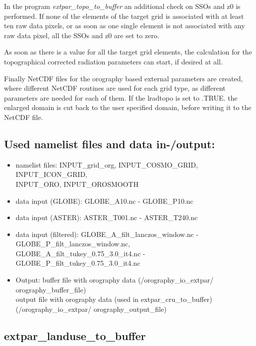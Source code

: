 \documentclass[a4paper,10pt,DIV14,BCOR1cm,titlepage,twoside]{scrartcl}
\begin{document}
In the program \textit{extpar\_topo\_to\_buffer} an additional check on SSOs and z0 is performed. If none of the elements of the target grid is associated with at least ten raw data pixels, or as soon as one single element is not associated with any raw data pixel, all the SSOs and z0 are set to zero.\par\medskip\noindent
As soon as there is a value for all the target grid elements, the calculation for the topographical corrected radiation parameters can start, if desired at all.\par\medskip\noindent
Finally NetCDF files for the orography based external parameters are created, where different NetCDF routines are used for each grid type, as different parameters are needed for each of them. If the lradtopo is set to .TRUE. the enlarged domain is cut back to the user specified domain, before writing it to the NetCDF file.\par\medskip\noindent
\subsection{Used namelist files and data in-/output:}
\begin{itemize}
 \item namelist files: INPUT\_grid\_org, INPUT\_COSMO\_GRID, INPUT\_ICON\_GRID, \\
     INPUT\_ORO, INPUT\_OROSMOOTH
\item data input (GLOBE): GLOBE\_A10.nc - GLOBE\_P10.nc 
\item data input (ASTER): ASTER\_T001.nc - ASTER\_T240.nc
\item data input (filtered): GLOBE\_A\_filt\_lanczos\_window.nc - GLOBE\_P\_filt\_lanczos\_window.nc, \\
    GLOBE\_A\_filt\_tukey\_0.75\_3.0\_it4.nc - GLOBE\_P\_filt\_tukey\_0.75\_3.0\_it4.nc
\item Output: buffer file with orography data (/orography\_io\_extpar/ orography\_buffer\_file) \\
              output file with orography data (used in extpar\_cru\_to\_buffer)\\
              (/orography\_io\_extpar/ orography\_output\_file)
\end{itemize}

\subsection{extpar\_landuse\_to\_buffer}\label{extpar_landuse_to_buffer}
\end{document}
